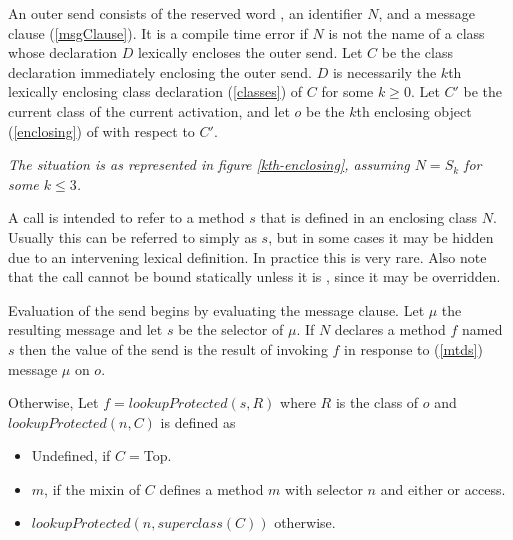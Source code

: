 \documentclass{article}
\newcommand{\code}[1]{{\sf #1}}
\begin{document}

An outer send consists of the reserved word \OUTER, an identifier $N$, and a message clause  (\ref{msgClause}). It is a compile time error if $N$ is not the name of a class whose declaration $D$  lexically encloses the outer send. Let $C$ be the class declaration  immediately enclosing the outer send. $D$ is necessarily the  $k$th lexically enclosing class declaration (\ref{classes}) of $C$ for some $k \ge 0$.  
 Let $C'$ be the current class of the current activation, and let $o$ be the $k$th enclosing object  (\ref{enclosing}) of \SELF{} with respect to $C'$. 


{\it
The situation is as represented in figure \ref{kth-enclosing},  assuming $N = S_k$ for some $k \le 3$.

A call  is intended to refer to a method $s$ that is defined in an enclosing class $N$. Usually this can be referred to simply as $s$, but in some cases it may be hidden due to an intervening lexical definition.  In practice this is very rare. Also note that the call cannot be bound statically unless it is \PRIVATE{}, since it may be overridden.
}

Evaluation of the send begins by evaluating  the message clause. Let $\mu$  the resulting message and let $s$ be the selector of $\mu$.
If $N$ declares a \PRIVATE{ } method $f$ named $s$ then the value of the send is the result of invoking $f$  in response to (\ref{mtds})  message $\mu$ on  $o$. 

Otherwise, Let $f = lookupProtected(s, R)$ where $R$ is the class of $o$ and $lookupProtected(n, C)$ is defined as
\begin{itemize}
\item Undefined, if $C =$\code{Top}.
\item $m$, if the mixin of $C$ defines a method $m$ with selector $n$ and either \PUBLIC{} or \PROTECTED{}  access.
\item $lookupProtected(n, superclass(C))$ otherwise.
\end{itemize}
\end{document}
